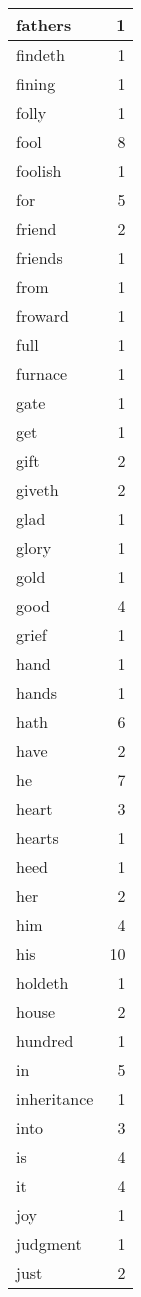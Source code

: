 \begin{center}
\begin{longtable}{l|r}
fathers & 1\\ \hline 
findeth & 1\\ \hline 
fining & 1\\ \hline 
folly & 1\\ \hline 
fool & 8\\ \hline 
foolish & 1\\ \hline 
for & 5\\ \hline 
friend & 2\\ \hline 
friends & 1\\ \hline 
from & 1\\ \hline 
froward & 1\\ \hline 
full & 1\\ \hline 
furnace & 1\\ \hline 
gate & 1\\ \hline 
get & 1\\ \hline 
gift & 2\\ \hline 
giveth & 2\\ \hline 
glad & 1\\ \hline 
glory & 1\\ \hline 
gold & 1\\ \hline 
good & 4\\ \hline 
grief & 1\\ \hline 
hand & 1\\ \hline 
hands & 1\\ \hline 
hath & 6\\ \hline 
have & 2\\ \hline 
he & 7\\ \hline 
heart & 3\\ \hline 
hearts & 1\\ \hline 
heed & 1\\ \hline 
her & 2\\ \hline 
him & 4\\ \hline 
his & 10\\ \hline 
holdeth & 1\\ \hline 
house & 2\\ \hline 
hundred & 1\\ \hline 
in & 5\\ \hline 
inheritance & 1\\ \hline 
into & 3\\ \hline 
is & 4\\ \hline 
it & 4\\ \hline 
joy & 1\\ \hline 
judgment & 1\\ \hline 
just & 2\\ \hline 

\end{longtable}
\end{center}
